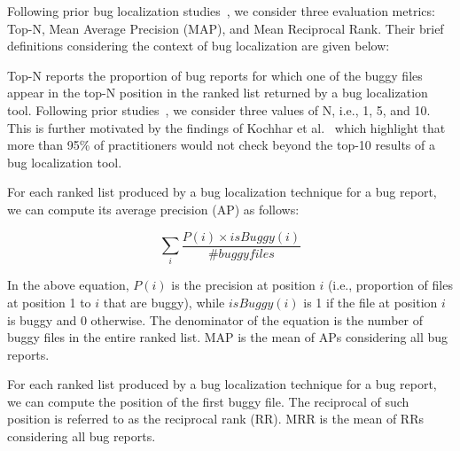 
Following prior bug localization studies~\cite{SahaLKP13,SahaLKP14,zhou2012should,huo2016learning}, we consider three evaluation metrics: Top-N, Mean Average Precision (MAP), and Mean Reciprocal Rank. Their brief definitions considering the context of bug localization are given below:

\vspace{0.2cm} Top-N reports the proportion of bug reports for which one of the buggy files appear in the top-N position in the ranked list returned by a bug localization tool. Following prior studies~\cite{SahaLKP13,SahaLKP14,zhou2012should,huo2016learning}, we consider three values of N, i.e., 1, 5, and 10. This is further motivated by the findings of Kochhar et al.~\cite{KochharXLL16} which highlight that more than 95\% of practitioners would not check beyond the top-10 results of a bug localization tool.

\vspace{0.2cm} For each ranked list produced by a bug localization technique for a bug report, we can compute its average precision (AP) as follows:

\begin{equation}
\sum_{i} \frac{P(i)\times isBuggy(i)}{\# buggy files}
\end{equation}

In the above equation, $\mathit{P(i)}$ is the precision at position $i$ (i.e., proportion of files at position 1 to $i$ that are buggy), while $\mathit{isBuggy(i)}$ is 1 if the file at position $i$ is buggy and 0 otherwise. The denominator of the equation is the number of buggy files in the entire ranked list. MAP is the mean of APs considering all bug reports.

\vspace{0.2cm} For each ranked list produced by a bug localization technique for a bug report, we can compute the position of the first buggy file. The reciprocal of such position is referred to as the reciprocal rank (RR). MRR is the mean of RRs considering all bug reports.

